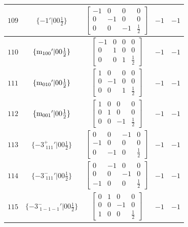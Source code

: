 \documentclass[fleqn,8pt]{jsarticle}
\begin{document}
\begin{longtable}{ccccc}
$ 109 $ & $ \{-1{}'|0 0 \frac{1}{2}\} $ & $ \begin{bmatrix} -1 & 0 & 0 & 0 \\ 0 & -1 & 0 & 0 \\ 0 & 0 & -1 & \frac{1}{2} \end{bmatrix} $ & $ -1 $ & $ -1 $ \\ \hline
$ 110 $ & $ \{{\rm m}_{100}{}'|0 0 \frac{1}{2}\} $ & $ \begin{bmatrix} -1 & 0 & 0 & 0 \\ 0 & 1 & 0 & 0 \\ 0 & 0 & 1 & \frac{1}{2} \end{bmatrix} $ & $ -1 $ & $ -1 $ \\ \hline
$ 111 $ & $ \{{\rm m}_{010}{}'|0 0 \frac{1}{2}\} $ & $ \begin{bmatrix} 1 & 0 & 0 & 0 \\ 0 & -1 & 0 & 0 \\ 0 & 0 & 1 & \frac{1}{2} \end{bmatrix} $ & $ -1 $ & $ -1 $ \\ \hline
$ 112 $ & $ \{{\rm m}_{001}{}'|0 0 \frac{1}{2}\} $ & $ \begin{bmatrix} 1 & 0 & 0 & 0 \\ 0 & 1 & 0 & 0 \\ 0 & 0 & -1 & \frac{1}{2} \end{bmatrix} $ & $ -1 $ & $ -1 $ \\ \hline
$ 113 $ & $ \{-3^{+}_{\,\,111}{}'|0 0 \frac{1}{2}\} $ & $ \begin{bmatrix} 0 & 0 & -1 & 0 \\ -1 & 0 & 0 & 0 \\ 0 & -1 & 0 & \frac{1}{2} \end{bmatrix} $ & $ -1 $ & $ -1 $ \\ \hline
$ 114 $ & $ \{-3^{-}_{\,\,111}{}'|0 0 \frac{1}{2}\} $ & $ \begin{bmatrix} 0 & -1 & 0 & 0 \\ 0 & 0 & -1 & 0 \\ -1 & 0 & 0 & \frac{1}{2} \end{bmatrix} $ & $ -1 $ & $ -1 $ \\ \hline
$ 115 $ & $ \{-3^{-}_{\,\,1-1-1}{}'|0 0 \frac{1}{2}\} $ & $ \begin{bmatrix} 0 & 1 & 0 & 0 \\ 0 & 0 & -1 & 0 \\ 1 & 0 & 0 & \frac{1}{2} \end{bmatrix} $ & $ -1 $ & $ -1 $ \\ \hline

\end{longtable}
\end{document}

